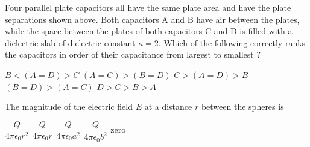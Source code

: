 \documentclass{../../../oss-apphys-exam}
\begin{document}
\begin{questions}
  \question Four parallel plate capacitors all have the same plate area and
  have the plate separations shown above. Both capacitors A and B have air
  between the plates, while the space between the plates of both capacitors C
  and D is filled with a dielectric slab of dielectric constant $\kappa=2$.
  Which of the following correctly ranks the capacitors in order of their
  capacitance from largest to smallest ?
  \begin{choices}
    \choice $B<(A=D)>C$
    \choice $(A=C)>(B=D)$
    \choice $C>(A=D)>B$
    \choice $(B=D)>(A=C)$
    \choice $D>C>B>A$
  \end{choices}

  
  
  \question The magnitude of the electric field $E$ at a distance $r$ between
  the spheres is
  \label{cap1}
  \begin{choices}
    \choice $\dfrac Q{4\pi\epsilon_0r^2}$
    \choice $\dfrac Q{4\pi\epsilon_0r}$
    \choice $\dfrac Q{4\pi\epsilon_0a^2}$
    \choice $\dfrac Q{4\pi\epsilon_0b^2}$
    \choice zero
  \end{choices}
  \newpage
  

\end{questions}
\end{document}
